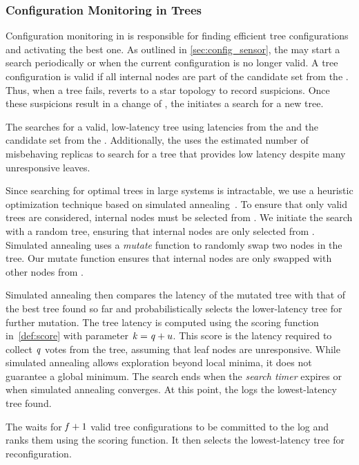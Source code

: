 \subsubsection{Configuration Monitoring in Trees}
\label{sec:tree-formation}

Configuration monitoring in \optitree is responsible for finding efficient tree configurations and activating the best one.
As outlined in \cref{sec:config_sensor}, the \cfgsensor may start a search periodically or when the current configuration is no longer valid.
A tree configuration is valid if all internal nodes are part of the candidate set \Cand from the \susmonitor.
Thus, when a tree fails, \optitree reverts to a star topology to record suspicions.
Once these suspicions result in a change of \Cand, the \cfgsensor initiates a search for a new tree.

The \cfgsensor searches for a valid, low-latency tree using latencies \lm from the \latmonitor and the candidate set \Cand from the \susmonitor.
Additionally, the \cfgsensor uses the estimated number of misbehaving replicas \un to search for a tree that provides low latency despite \un many unresponsive leaves.

Since searching for optimal trees in large systems is intractable, we use a heuristic optimization technique based on simulated annealing~\cite{simulatedannealing}.
To ensure that only valid trees are considered, internal nodes must be selected from \Cand.
We initiate the search with a random tree, ensuring that internal nodes are only selected from \Cand.
Simulated annealing uses a \textit{mutate} function to randomly swap two nodes in the tree.
Our mutate function ensures that internal nodes are only swapped with other nodes from \Cand.

Simulated annealing then compares the latency of the mutated tree with that of the best tree found so far and probabilistically selects the lower-latency tree for further mutation.
The tree latency is computed using the scoring function in~\cref{def:score} with parameter $\mathit{k}=\mathit{q}+u$.
This score is the latency required to collect $\mathit{q}$ votes from the tree, assuming that \un leaf nodes are unresponsive.
While simulated annealing allows exploration beyond local minima, it does not guarantee a global minimum.
The search ends when the \textit{search timer} expires or when simulated annealing converges.
At this point, the \cfgsensor logs the lowest-latency tree found.

The \cfgmonitor waits for $\mathit{f}+1$ valid tree configurations to be committed to the log and ranks them using the scoring function.
It then selects the lowest-latency tree for reconfiguration.
